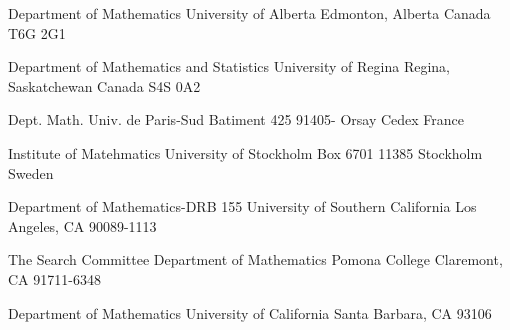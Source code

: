 \documentclass[12pt]{letter}
\begin{document}
\large\sf

\begin{labels}
Department of Mathematics
University of Alberta
Edmonton, Alberta
Canada T6G 2G1

Department of Mathematics
and Statistics
University of Regina
Regina, Saskatchewan
Canada S4S 0A2

Dept. Math. Univ.
de Paris-Sud
Batiment 425
91405- Orsay Cedex
France

Institute of Matehmatics
University of Stockholm
Box 6701
11385 Stockholm
Sweden

Department of Mathematics-DRB 155
University of Southern California
Los Angeles, CA 90089-1113

The Search Committee
Department of Mathematics
Pomona College
Claremont, CA 91711-6348

Department of Mathematics
University of California
Santa Barbara, CA 93106

\end{labels}
\end{document}
